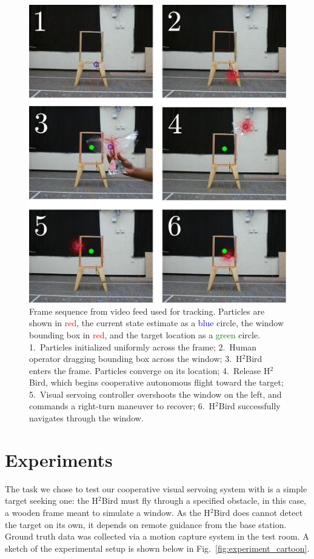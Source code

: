 \documentclass{aamas2013}
\begin{document}
\begin{figure}[tb]
\centering
\includegraphics[width=\linewidth]{figures/pf_screencap.pdf}
\caption{Frame sequence from video feed used for tracking. Particles 
are shown in \textcolor{red}{red}, the current state estimate as a 
\textcolor{blue}{blue} circle, the window bounding box in
\textcolor{red}{red}, and the target location as a \textcolor{green}{green} 
circle. 1.~Particles initialized uniformly across the frame; 2.~Human operator 
dragging bounding box across the window; 3.~H$^2$Bird enters the frame. 
Particles converge on its location; 4.~Release H$^2$Bird, which 
begins cooperative autonomous flight toward the target; 5.~Visual servoing 
controller overshoots the window on the left, and commands a right-turn 
maneuver to recover; 6.~H$^2$Bird successfully navigates through the window.}
\label{fig:pf_screencap}
\end{figure}


\section{Experiments}
The task we chose to test our cooperative visual servoing system with is a 
simple target seeking one: the H$^2$Bird must fly through a specified obstacle,
in this case, a wooden frame meant to simulate a window. As the H$^2$Bird does
cannot detect the target on its own, it depends on remote guidance from the
base station. Ground truth data was collected via a motion capture system in
the test room. A sketch of the experimental setup is shown below in Fig.~\ref{fig:experiment_cartoon}.
\end{document}
